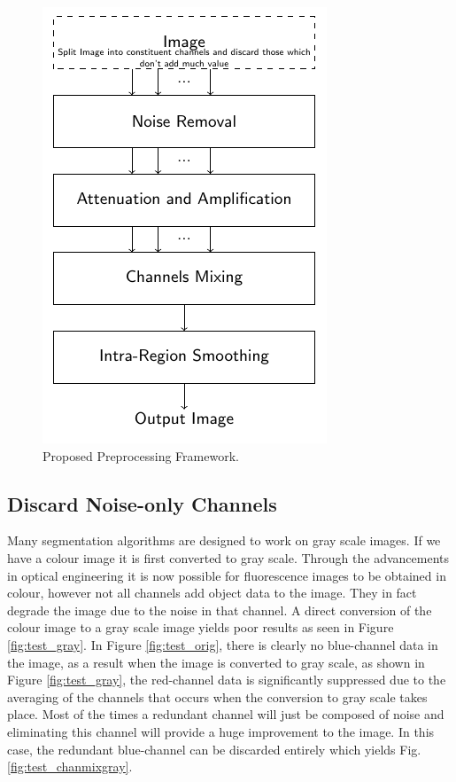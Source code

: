 \documentclass[a4paper,11pt]{ijamas}
\begin{document}
\begin{figure}[!t]
\centering
\includegraphics[width=0.80\columnwidth]{./figs/5.pdf}
\caption{Proposed Preprocessing Framework.}
\label{fig:proposed_framework}
\end{figure}



\subsection{Discard Noise-only Channels}
\label{sec:proposed_remove_channels}
Many segmentation algorithms are designed to work on gray scale images. If we have a colour image it is first converted to gray scale. Through the advancements in optical engineering it is now possible for fluorescence images to be obtained in colour, however not all channels add object data to the image. They in fact degrade the image due to the noise in that channel.
A direct conversion of the colour image to a gray scale image yields poor results as seen in Figure \ref{fig:test_gray}. In Figure \ref{fig:test_orig}, there is clearly no blue-channel data in the image, as a result when the image is converted to gray scale, as shown in Figure \ref{fig:test_gray}, the red-channel data is significantly suppressed due to the averaging of the channels that occurs when the conversion to gray scale takes place. Most of the times a redundant channel will just be composed of noise and eliminating this channel will provide a huge improvement to the image. In this case, the redundant blue-channel can be discarded entirely which yields Fig. \ref{fig:test_chanmixgray}.
\end{document}
